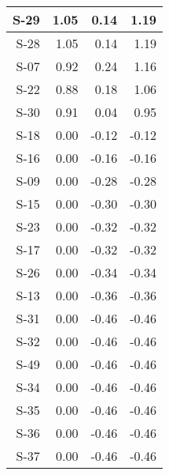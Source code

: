 \begin{tabular}{ | r | r | r | r | }
    \hline
                  S-29  &            1.05  &            0.14  &            1.19  \\
    \hline
                  S-28  &            1.05  &            0.14  &            1.19  \\
    \hline
                  S-07  &            0.92  &            0.24  &            1.16  \\
    \hline
                  S-22  &            0.88  &            0.18  &            1.06  \\
    \hline
                  S-30  &            0.91  &            0.04  &            0.95  \\
    \hline
                  S-18  &            0.00  &           -0.12  &           -0.12  \\
    \hline
                  S-16  &            0.00  &           -0.16  &           -0.16  \\
    \hline
                  S-09  &            0.00  &           -0.28  &           -0.28  \\
    \hline
                  S-15  &            0.00  &           -0.30  &           -0.30  \\
    \hline
                  S-23  &            0.00  &           -0.32  &           -0.32  \\
    \hline
                  S-17  &            0.00  &           -0.32  &           -0.32  \\
    \hline
                  S-26  &            0.00  &           -0.34  &           -0.34  \\
    \hline
                  S-13  &            0.00  &           -0.36  &           -0.36  \\
    \hline
                  S-31  &            0.00  &           -0.46  &           -0.46  \\
    \hline
                  S-32  &            0.00  &           -0.46  &           -0.46  \\
    \hline
                  S-49  &            0.00  &           -0.46  &           -0.46  \\
    \hline
                  S-34  &            0.00  &           -0.46  &           -0.46  \\
    \hline
                  S-35  &            0.00  &           -0.46  &           -0.46  \\
    \hline
                  S-36  &            0.00  &           -0.46  &           -0.46  \\
    \hline
                  S-37  &            0.00  &           -0.46  &           -0.46  \\

\end{tabular}

